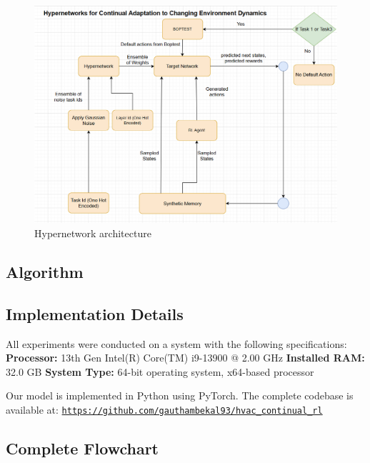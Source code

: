 \documentclass{article}
\begin{document}
\begin{figure}[H]
  \centering
  \includegraphics[width=\linewidth,keepaspectratio]{FlowCharts/Hypernetwork.png}
  \caption{Hypernetwork architecture}
  \label{fig:hypernetwork}
\end{figure}


\clearpage
\vspace{-1em}  %
\subsection{Algorithm}
\vspace{-0.5em}  %



\subsection*{Implementation Details}

All experiments were conducted on a system with the following specifications:  
\textbf{Processor:} 13th Gen Intel(R) Core(TM) i9-13900 @ 2.00 GHz  
\textbf{Installed RAM:} 32.0 GB 
\textbf{System Type:} 64-bit operating system, x64-based processor  

Our model is implemented in Python using PyTorch. The complete codebase is available at:  
\href{https://github.com/gauthambekal93/hvac_continual_rl}{\texttt{https://github.com/gauthambekal93/hvac\_continual\_rl}}


\clearpage

\subsection*{Complete Flowchart}
\vspace{-1em}  %
\end{document}
